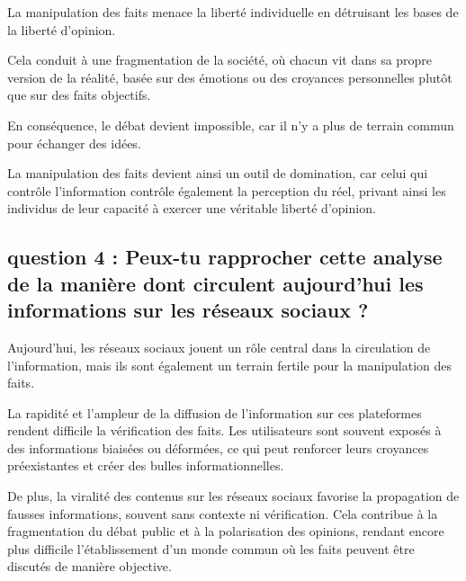 \documentclass[a4paper,12pt]{article}
\begin{document}
La manipulation des faits menace la liberté individuelle en détruisant les bases de la liberté d’opinion. 

Cela conduit à une fragmentation de la société, où chacun vit dans sa propre version de la réalité, basée sur des émotions ou des croyances personnelles plutôt que sur des faits objectifs. 

En conséquence, le débat devient impossible, car il n’y a plus de terrain commun pour échanger des idées. 

La manipulation des faits devient ainsi un outil de domination, car celui qui contrôle l’information contrôle également la perception du réel, privant ainsi les individus de leur capacité à exercer une véritable liberté d’opinion.

\subsection{question 4 : Peux-tu rapprocher cette analyse de la manière dont circulent aujourd’hui les
informations sur les réseaux sociaux ?}
Aujourd’hui, les réseaux sociaux jouent un rôle central dans la circulation de l’information, mais ils sont également un terrain fertile pour la manipulation des faits.

La rapidité et l’ampleur de la diffusion de l’information sur ces plateformes rendent difficile la vérification des faits. Les utilisateurs sont souvent exposés à des informations biaisées ou déformées, ce qui peut renforcer leurs croyances préexistantes et créer des bulles informationnelles. 

De plus, la viralité des contenus sur les réseaux sociaux favorise la propagation de fausses informations, souvent sans contexte ni vérification. Cela contribue à la fragmentation du débat public et à la polarisation des opinions, rendant encore plus difficile l’établissement d’un monde commun où les faits peuvent être discutés de manière objective.
\end{document}

